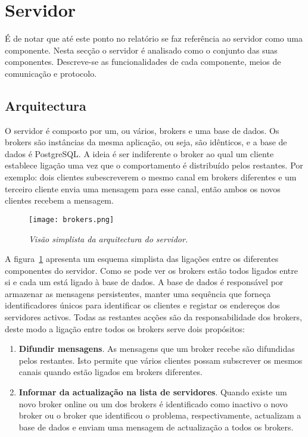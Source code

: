 \section{Servidor}

É de notar que até este ponto no relatório se faz referência ao servidor como uma componente.
Nesta secção o servidor é analisado como o conjunto das suas componentes.
Descreve-se as funcionalidades de cada componente, meios de comunicação e protocolo.

\subsection{Arquitectura}

O servidor é composto por um, ou vários, brokers e uma base de dados. Os brokers são instâncias da mesma aplicação, ou seja, são idênticos, e a base de dados é PostgreSQL. A ideia é ser indiferente o broker ao qual um cliente establece ligação uma vez que o comportamento é distribuído pelos restantes.
Por exemplo: dois clientes subescreverem o mesmo canal em brokers diferentes e um terceiro cliente envia uma mensagem para esse canal, então ambos os novos clientes recebem a mensagem.

\begin{figure}[H]
\centering
\texttt{[image: brokers.png]}
\caption{\textit{Visão simplista da arquitectura do servidor.}}
\label{fig:brokers-arq}
\end{figure}

A figura~\ref{fig:brokers-arq} apresenta um esquema simplista das ligações entre os diferentes componentes do servidor. Como se pode ver os brokers estão todos ligados entre si e cada um está ligado à base de dados.
A base de dados é responsável por armazenar as mensagens persistentes, manter uma sequência que forneça identificadores únicos para identificar os clientes e registar os endereços dos servidores activos. Todas as restantes acções são da responsabilidade dos brokers, deste modo a ligação entre todos os brokers serve dois propósitos:

\begin{enumerate}
\item \textbf{Difundir mensagens}. As mensagens que um broker recebe são difundidas pelos restantes. Isto permite que vários clientes possam subscrever os mesmos canais quando estão ligados em brokers diferentes.
\item \textbf{Informar da actualização na lista de servidores}. Quando existe um novo broker online ou um dos brokers é identificado como inactivo o novo broker ou o broker que identificou o problema, respectivamente, actualizam a base de dados e enviam uma mensagem de actualização a todos os brokers.
\end{enumerate}


